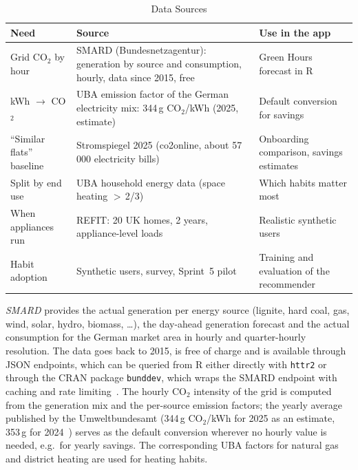 \documentclass[conference]{IEEEtran}
\newcommand{\COtwo}{CO$_2$}
\newcommand{\pkg}[1]{\texttt{#1}}
\begin{document}
\begin{table}[!t]
\caption{Data Sources}
\label{tab:data}
\centering
\footnotesize
\begin{tabular}{@{}L{1.7cm}L{3.45cm}L{2.85cm}@{}}
\toprule
Need & Source & Use in the app \\
\midrule
Grid \COtwo{} by hour & SMARD (Bundesnetzagentur): generation by source and consumption, hourly, data since 2015, free~\cite{smard} & Green Hours forecast in R \\
kWh $\rightarrow$ \COtwo{} & UBA emission factor of the German electricity mix: 344\,g \COtwo/kWh (2025, estimate)~\cite{uba-strommix} & Default conversion for savings \\
``Similar flats'' baseline & Stromspiegel 2025 (co2online, about 57\,000 electricity bills)~\cite{stromspiegel} & Onboarding comparison, savings estimates \\
Split by end use & UBA household energy data (space heating $>$\,2/3)~\cite{uba-haushalte} & Which habits matter most \\
When appliances run & REFIT: 20 UK homes, 2 years, appliance-level loads~\cite{refit} & Realistic synthetic users \\
Habit adoption & Synthetic users, survey, Sprint~5 pilot & Training and evaluation of the recommender \\
\bottomrule
\end{tabular}
\end{table}

\emph{SMARD} provides the actual generation per energy source (lignite, hard coal, gas, wind, solar, hydro, biomass, \ldots), the day-ahead generation forecast and the actual consumption for the German market area in hourly and quarter-hourly resolution. The data goes back to 2015, is free of charge and is available through JSON endpoints, which can be queried from R either directly with \pkg{httr2} or through the CRAN package \pkg{bunddev}, which wraps the SMARD endpoint with caching and rate limiting~\cite{bunddev}. The hourly \COtwo{} intensity of the grid is computed from the generation mix and the per-source emission factors; the yearly average published by the Umweltbundesamt (344\,g \COtwo/kWh for 2025 as an estimate, 353\,g for 2024~\cite{uba-strommix}) serves as the default conversion wherever no hourly value is needed, e.g.\ for yearly savings. The corresponding UBA factors for natural gas and district heating are used for heating habits.
\end{document}
